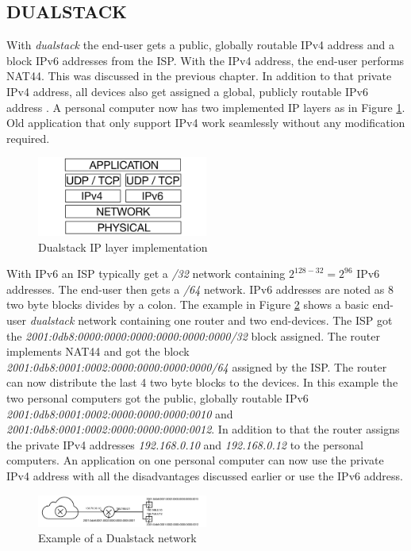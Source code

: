 \documentclass[format=sigconf, natbib=true, nonacm=true]{acmart}
\begin{document}
    \subsection{DUALSTACK}
    With \textit{dualstack} the end-user gets a public, globally routable IPv4 address and a block IPv6 addresses from the ISP. With the IPv4 address, the end-user performs NAT44. This was discussed in the previous chapter. In addition to that private IPv4 address, all devices also get assigned a global, publicly routable IPv6 address \cite{8716482}. A personal computer now has two implemented IP layers as in Figure \ref{fig:dualstack}. Old application that only support IPv4 work seamlessly without any modification required.
    \begin{figure}
        \centering
        \includegraphics[width=0.5\textwidth]{images/dualstack.png}
        \caption{Dualstack IP layer implementation}
        \label{fig:dualstack}
    \end{figure}
    With IPv6 an ISP typically get a \textit{/32} network containing $2^{128-32}=2^{96}$ IPv6 addresses. The end-user then gets a \textit{/64} network. IPv6 addresses are noted as 8 two byte blocks divides by a colon. The example in Figure \ref{fig:dualstack_network} shows a basic end-user \textit{dualstack} network containing one router and two end-devices. The ISP got the \textit{2001:0db8:0000:0000:0000:0000:0000:0000/32} block assigned. The router implements NAT44 and got the block \textit{2001:0db8:0001:0002:0000:0000:0000:0000/64} assigned by the ISP. The router can now distribute the last 4 two byte blocks to the devices. In this example the two personal computers got the public, globally routable IPv6 \textit{2001:0db8:0001:0002:0000:0000:0000:0010} and \textit{2001:0db8:0001:0002:0000:0000:0000:0012}. In addition to that the router assigns the private IPv4 addresses \textit{192.168.0.10} and \textit{192.168.0.12} to the personal computers. An application on one personal computer can now use the private IPv4 address with all the disadvantages discussed earlier or use the IPv6 address.
    \begin{figure}
        \centering
        \includegraphics[width=0.5\textwidth]{images/dualstack_network.png}
        \caption{Example of a Dualstack network}
        \label{fig:dualstack_network}
    \end{figure}
\end{document}
